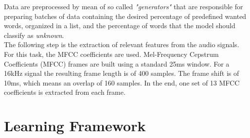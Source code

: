\noindent Data are preprocessed by mean of so called \mbox{{\it{"generators"}}} that are responsible for preparing batches of data containing the desired percentage of predefined wanted words, organized in a list, and the percentage of words that the model should classify as {\it {unknown}}. \\The following step is the extraction of relevant features from the audio signals. For this task, the MFCC coefficients are used. Mel-Frequency Cepstrum Coefficients (MFCC) frames are built using a standard 25ms window. For a 16kHz signal the resulting frame length is of 400 samples. The frame shift is of 10ms, which means an overlap of 160 samples. In the end, one set of 13 MFCC coefficients is extracted from each frame.  



\section{Learning Framework}
\label{sec:learning_framework}

